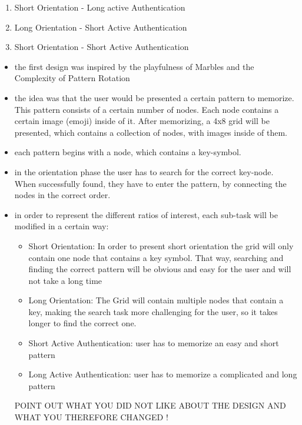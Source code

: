 \begin{enumerate}
    \item Short Orientation - Long active Authentication
    \item Long Orientation - Short Active Authentication
    \item Short Orientation - Short Active Authentication
\end{enumerate}

\begin{itemize}
\item the first design was inspired by the playfulness of Marbles and the Complexity of Pattern Rotation
\item the idea was that the user would be presented a certain pattern to memorize. This pattern consists of a certain number of nodes. Each node contains a certain image (emoji) inside of it. After memorizing, a 4x8 grid will be presented, which contains a collection of nodes, with images inside of them. 
\item each pattern begins with a node, which contains a key-symbol. 
\item in the orientation phase the user has to search for the correct key-node. When successfully found, they have to enter the pattern, by connecting the nodes in the correct order. 
\item in order to represent the different ratios of interest, each sub-task will be modified in a certain way:
    
\begin{itemize}
\item Short Orientation: In order to present short orientation the grid will only contain one node that contains a key symbol. That way, searching and finding the correct pattern will be obvious and easy for the user and will not take a long time 
\item Long Orientation: The Grid will contain multiple nodes that contain a key, making the search task more challenging for the user, so it takes longer to find the correct one. 
\item Short Active Authentication: user has to memorize an easy and short pattern
\item Long Active Authentication: user has to memorize a complicated and long pattern 
\end{itemize}

POINT OUT WHAT YOU DID NOT LIKE ABOUT THE DESIGN AND WHAT YOU THEREFORE CHANGED ! 


\end{itemize}
